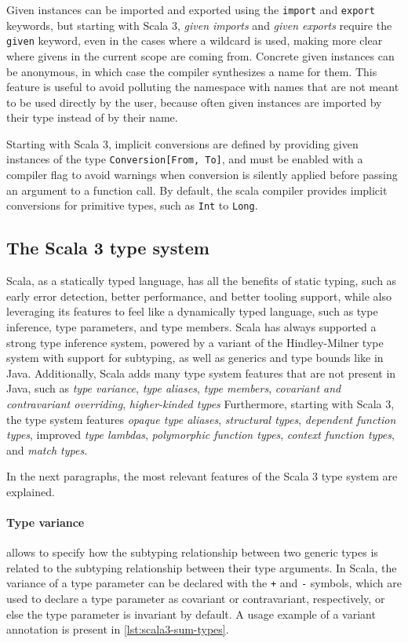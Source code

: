 Given instances can be imported and exported using the \texttt{import} and \texttt{export} keywords, but starting with Scala 3, \textit{given imports} and \textit{given exports} require the \texttt{given} keyword, even in the cases where a wildcard is used, making more clear where givens in the current scope are coming from.
%
Concrete given instances can be anonymous, in which case the compiler synthesizes a name for them.
%
This feature is useful to avoid polluting the namespace with names that are not meant to be used directly by the user, because often given instances are imported by their type instead of by their name.

Starting with Scala 3, implicit conversions are defined by providing given instances of the type \texttt{Conversion[From, To]}, and must be enabled with a compiler flag to avoid warnings when conversion is silently applied before passing an argument to a function call.
%
By default, the scala compiler provides implicit conversions for primitive types, such as \texttt{Int} to \texttt{Long}.


\subsection{The Scala 3 type system} \label{chap:background->sec:scala3->subsec:type-system}

Scala, as a statically typed language, has all the benefits of static typing, such as early error detection, better performance, and better tooling support, while also leveraging its features to feel like a dynamically typed language, such as type inference, type parameters, and type members.
%
Scala has always supported a strong type inference system, powered by a variant of the Hindley-Milner type system with support for subtyping, as well as generics and type bounds like in Java.
%
Additionally, Scala adds many type system features that are not present in Java, such as \textit{type variance}, \textit{type aliases}, \textit{type members}, \textit{covariant and contravariant overriding}, \textit{higher-kinded types}
%
Furthermore, starting with Scala 3, the type system features \textit{opaque type aliases}, \textit{structural types}, \textit{dependent function types}, improved \textit{type lambdas}, \textit{polymorphic function types}, \textit{context function types}, and \textit{match types}.

In the next paragraphs, the most relevant features of the Scala 3 type system are explained.

\paragraph{Type variance} allows to specify how the subtyping relationship between two generic types is related to the subtyping relationship between their type arguments.
%
In Scala, the variance of a type parameter can be declared with the \texttt{+} and \texttt{-} symbols, which are used to declare a type parameter as covariant or contravariant, respectively, or else the type parameter is invariant by default.
%
A usage example of a variant annotation is present in \cref{lst:scala3-sum-types}.

